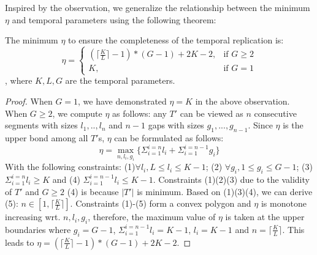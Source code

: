 Inspired by the observation, we generalize the relationship between
the minimum $\eta$ and temporal parameters using the following theorem:
%
%
%


\begin{theorem}
\label{THM:RP_ETA}
The minimum $\eta$ to ensure the completeness of the temporal replication is:
\[
   \eta = 
\begin{cases}
    (\lceil \frac{K}{L} \rceil -1)*(G-1)+2K -2, & \text{if } G \geq 2\\
    K,              & \text{if } G = 1
\end{cases}
\]
, where $K,L,G$ are the temporal parameters.
\end{theorem}

\begin{proof}
When $G = 1$, we have demonstrated $\eta=K$
in the above observation. When $G \geq 2$, we compute $\eta$ as follows:
any $T'$ can be viewed as $n$ consecutive segments with sizes $l_1,..,l_n$
and $n-1$ gaps with sizes $g_1,...,g_{n-1}$.
Since $\eta$ is the upper bond among all $T'$s, $\eta$ can be formulated 
as follows:
\begin{equation}
\eta = \max_{n,l_i,g_i} \{ \Sigma_{i=1}^{i=n} l_i + \Sigma_{i=1}^{i=n-1} g_i \}
\end{equation}
With the following constraints: (1)$\forall l_i, L \leq l_i \leq K-1$; (2)
$\forall g_i, 1 \leq g_i \leq G-1 $; (3) $\Sigma_{i=1}^{i=n} l_i \geq K$ and
(4) $\Sigma_{i=1}^{i=n-1}l_i  \leq K-1$. Constraints (1)(2)(3) due to the 
validity of $T'$ and $G\geq 2$ (4) is because $|T'|$ is minimum.
Based on (1)(3)(4), we can derive (5):  $n \in [1, \lceil \frac{K}{L} \rceil]$.
Constraints (1)-(5) form a convex polygon and $\eta$ is monotone
increasing wrt. $n, l_i, g_i$, therefore, the maximum value of $\eta$ is taken at the upper boundaries
where $g_i = G-1$, 
$\Sigma_{i=1}^{i=n-1}l_i = K-1$, $l_i = K-1$
and $n = \lceil \frac{K}{L} \rceil$. This leads to  $\eta = (\lceil \frac{K}{L} \rceil -1)*(G-1)+2K -2$.
\end{proof}


